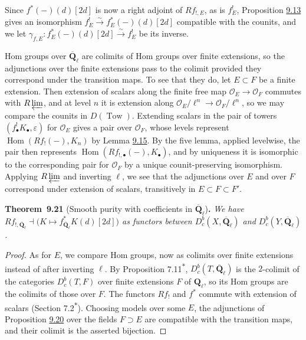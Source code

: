 \documentclass[11pt]{article}
\newenvironment{bpstatement}[2]{\par\addvspace{0.6\baselineskip}\noindent\textbf{#1}#2\textbf{.}\enspace\ignorespaces}
  {\par\addvspace{0.4\baselineskip}}
\newenvironment{bpstatementit}[2]{\begin{bpstatement}{#1}{#2}\itshape\ignorespaces}{\end{bpstatement}}
\newcommand{\bpout}[1]{#1\textsuperscript{\hyperlink{bp-outside}{\ensuremath{\ast}}}}
\providecommand{\Dbc}{}\renewcommand{\Dbc}{D^b_c}
\begin{document}
\label{bp70}%
Since \(f^*(-)(d)[2d]\) is now a right adjoint of \(Rf_{!,E}\), as is \(f^!_E\), Proposition \hyperref[bp43]{9.13} gives an isomorphism \(f^!_E\xrightarrow{\sim}f_E^*(-)(d)[2d]\) compatible with the counits, and we let \(\gamma_{f,E}:f_E^*(-)(d)[2d]\xrightarrow{\sim}f^!_E\) be its inverse.

Hom groups over \(\overline{\mathbf Q}_\ell\) are colimits of Hom groups over finite extensions, so the adjunctions over the finite extensions pass to the colimit provided they correspond under the transition maps. To see that they do, let \(E\subset F\) be a finite extension. Then extension of scalars along the finite free map \(\mathcal O_E\to\mathcal O_F\) commutes with \(R\varprojlim\), and at level \(n\) it is extension along \(\mathcal O_E/\ell^n\to\mathcal O_F/\ell^n\), so we may compare the counits in \(D(\operatorname{Tow})\). Extending scalars in the pair of towers \((f_\bullet^!K_\bullet,\varepsilon)\) for \(\mathcal O_E\) gives a pair over \(\mathcal O_F\), whose levels represent \(\operatorname{Hom}(Rf_!(-),K_n)\) by Lemma \hyperref[bp49]{9.15}. By the five lemma, applied levelwise, the pair then represents \(\operatorname{Hom}(Rf_{!,\bullet}(-),K_\bullet)\), and by uniqueness it is isomorphic to the corresponding pair for \(\mathcal O_F\) by a unique counit-preserving isomorphism. Applying \(R\varprojlim\) and inverting \(\ell\), we see that the adjunctions over \(E\) and over \(F\) correspond under extension of scalars, transitively in \(E\subset F\subset F'\).

\label{bp71}%
\begin{bpstatementit}{Theorem~9.21}{ (Smooth purity with coefficients in $\overline{\mathbf Q}_\ell$)}
We have \(Rf_{!,\overline{\mathbf Q}_\ell}\dashv\bigl(K\mapsto f_{\overline{\mathbf Q}_\ell}^*K(d)[2d]\bigr)\) as functors between \(\Dbc(X,\overline{\mathbf Q}_\ell)\) and \(\Dbc(Y,\overline{\mathbf Q}_\ell)\).
\end{bpstatementit}

\begin{proof}[{Proof}]\label{bp72}%
As for \(E\), we compare Hom groups, now as colimits over finite extensions instead of after inverting \(\ell\). By Proposition \bpout{7.11}, \(\Dbc(T,\overline{\mathbf Q}_\ell)\) is the \(2\)-colimit of the categories \(\Dbc(T,F)\) over finite extensions \(F\) of \(\mathbf Q_\ell\), so its Hom groups are the colimits of those over \(F\). The functors \(Rf_!\) and \(f^*\) commute with extension of scalars (Section \bpout{7.2}). Choosing models over some \(E\), the adjunctions of Proposition \hyperref[bp68]{9.20} over the fields \(F\supset E\) are compatible with the transition maps, and their colimit is the asserted bijection.
\end{proof}
\end{document}
